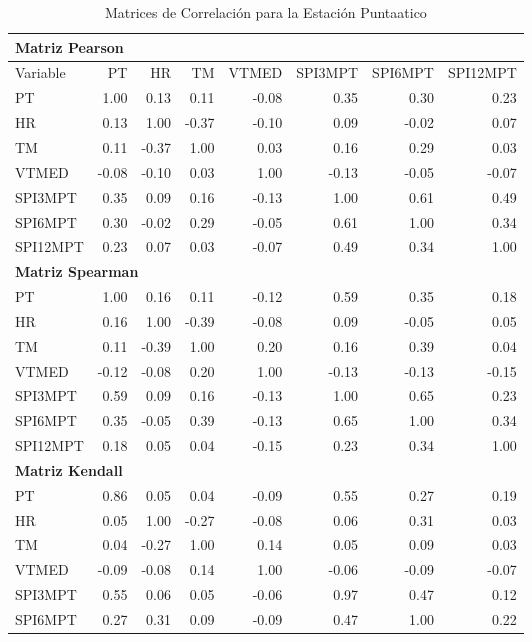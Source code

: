 \begin{table}[ht]
\centering
\caption{Matrices de Correlación para la Estación Puntaatico}
\begin{tabular}{lrrrrrrr}
\toprule
\multicolumn{8}{l}{\textbf{Matriz Pearson}} \\
\midrule
Variable & PT & HR & TM & VTMED & SPI3MPT & SPI6MPT & SPI12MPT \\
\midrule
PT       & 1.00 & 0.13 & 0.11 & -0.08 & 0.35 & 0.30 & 0.23 \\
HR       & 0.13 & 1.00 & -0.37 & -0.10 & 0.09 & -0.02 & 0.07 \\
TM       & 0.11 & -0.37 & 1.00 & 0.03 & 0.16 & 0.29 & 0.03 \\
VTMED    & -0.08 & -0.10 & 0.03 & 1.00 & -0.13 & -0.05 & -0.07 \\
SPI3MPT  & 0.35 & 0.09 & 0.16 & -0.13 & 1.00 & 0.61 & 0.49 \\
SPI6MPT  & 0.30 & -0.02 & 0.29 & -0.05 & 0.61 & 1.00 & 0.34 \\
SPI12MPT & 0.23 & 0.07 & 0.03 & -0.07 & 0.49 & 0.34 & 1.00 \\
\midrule
\multicolumn{8}{l}{\textbf{Matriz Spearman}} \\
\midrule
PT       & 1.00 & 0.16 & 0.11 & -0.12 & 0.59 & 0.35 & 0.18 \\
HR       & 0.16 & 1.00 & -0.39 & -0.08 & 0.09 & -0.05 & 0.05 \\
TM       & 0.11 & -0.39 & 1.00 & 0.20 & 0.16 & 0.39 & 0.04 \\
VTMED    & -0.12 & -0.08 & 0.20 & 1.00 & -0.13 & -0.13 & -0.15 \\
SPI3MPT  & 0.59 & 0.09 & 0.16 & -0.13 & 1.00 & 0.65 & 0.23 \\
SPI6MPT  & 0.35 & -0.05 & 0.39 & -0.13 & 0.65 & 1.00 & 0.34 \\
SPI12MPT & 0.18 & 0.05 & 0.04 & -0.15 & 0.23 & 0.34 & 1.00 \\
\midrule
\multicolumn{8}{l}{\textbf{Matriz Kendall}} \\
\midrule
PT       & 0.86 & 0.05 & 0.04 & -0.09 & 0.55 & 0.27 & 0.19 \\
HR       & 0.05 & 1.00 & -0.27 & -0.08 & 0.06 & 0.31 & 0.03 \\
TM       & 0.04 & -0.27 & 1.00 & 0.14 & 0.05 & 0.09 & 0.03 \\
VTMED    & -0.09 & -0.08 & 0.14 & 1.00 & -0.06 & -0.09 & -0.07 \\
SPI3MPT  & 0.55 & 0.06 & 0.05 & -0.06 & 0.97 & 0.47 & 0.12 \\
SPI6MPT  & 0.27 & 0.31 & 0.09 & -0.09 & 0.47 & 1.00 & 0.22 \\

\end{tabular}
\end{table}
